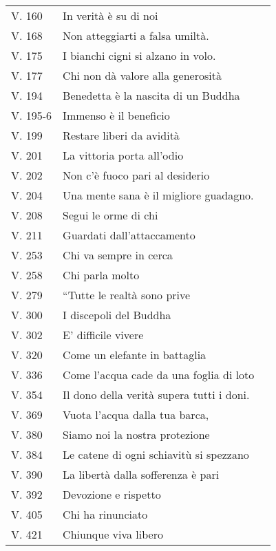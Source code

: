{\begin{longtable}[c]{llr}
V. 160 & In verit\`{a} \`{e} su di noi & \pageref{dhp-160}\\
V. 168 & Non atteggiarti a falsa umilt\`{a}. & \pageref{dhp-168}\\
V. 175 & I bianchi cigni si alzano in volo. & \pageref{dhp-175}\\
V. 177 & Chi non d\`{a} valore alla generosit\`{a} & \pageref{dhp-177}\\
V. 194 & Benedetta \`{e} la nascita di un Buddha & \pageref{dhp-194}\\
V. 195-6 & Immenso \`{e} il beneficio & \pageref{dhp-195}\\
V. 199 & Restare liberi da avidit\`{a} & \pageref{dhp-199}\\
V. 201 & La vittoria porta all'odio & \pageref{dhp-201}\\
V. 202 & Non c'\`{e} fuoco pari al desiderio & \pageref{dhp-202}\\
V. 204 & Una mente sana \`{e} il migliore guadagno. & \pageref{dhp-204}\\
V. 208 & Segui le orme di chi & \pageref{dhp-208}\\
V. 211 & Guardati dall'attaccamento & \pageref{dhp-211}\\
V. 253 & Chi va sempre in cerca & \pageref{dhp-253}\\
V. 258 & Chi parla molto & \pageref{dhp-258}\\
V. 279 & ``Tutte le realt\`{a} sono prive  & \pageref{dhp-279}\\
V. 300 & I discepoli del Buddha & \pageref{dhp-300}\\
V. 302 & E' difficile vivere & \pageref{dhp-302}\\
V. 320 & Come un elefante in battaglia & \pageref{dhp-320}\\
V. 336 & Come l'acqua cade da una foglia di loto & \pageref{dhp-336}\\
V. 354 & Il dono della verit\`{a} supera tutti i doni. & \pageref{dhp-354}\\
V. 369 & Vuota l'acqua dalla tua barca, & \pageref{dhp-369}\\
V. 380 & Siamo noi la nostra protezione & \pageref{dhp-380}\\
V. 384 & Le catene di ogni schiavitù si spezzano & \pageref{dhp-384}\\
V. 390 & La libert\`{a} dalla sofferenza \`{e} pari & \pageref{dhp-390}\\
V. 392 & Devozione e rispetto & \pageref{dhp-392}\\
V. 405 & Chi ha rinunciato & \pageref{dhp-405}\\
V. 421 & Chiunque viva libero & \pageref{dhp-421}\\
\end{longtable}

}

